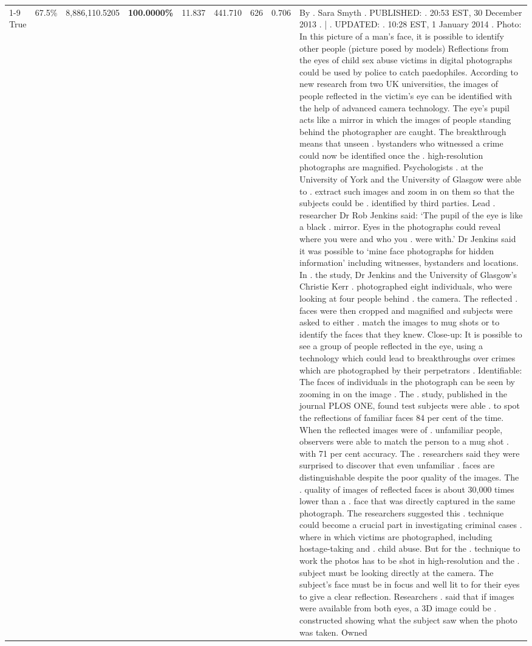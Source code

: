 \begin{table}[H]
\begin{tabular}{lllrlllll}
\cline{1-9}
True & 67.5\% & 8,886,110.5205 & \bfseries \color{red} 100.0000\% & 11.837 & 441.710 & 626 & 0.706 & By . Sara Smyth . PUBLISHED: . 20:53 EST, 30 December 2013 . | . UPDATED: . 10:28 EST, 1 January 2014 . Photo: In this picture of a man's face, it is possible to identify other people (picture posed by models) Reflections from the eyes of child sex abuse victims in digital photographs could be used by police to catch paedophiles. According to new research from two UK universities, the images of people reflected in the victim's eye can be identified with the help of advanced camera technology. The eye's pupil acts like a mirror in which the images of people standing behind the photographer are caught. The breakthrough means that unseen . bystanders who witnessed a crime could now be identified once the . high-resolution photographs are magnified. Psychologists . at the University of York and the University of Glasgow were able to . extract such images and zoom in on them so that the subjects could be . identified by third parties. Lead . researcher Dr Rob Jenkins said: ‘The pupil of the eye is like a black . mirror. Eyes in the photographs could reveal where you were and who you . were with.' Dr Jenkins said it was possible to ‘mine face photographs for hidden information' including witnesses, bystanders and locations. In . the study, Dr Jenkins and the University of Glasgow's Christie Kerr . photographed eight individuals, who were looking at four people behind . the camera. The reflected . faces were then cropped and magnified and subjects were asked to either . match the images to mug shots or to identify the faces that they knew. Close-up: It is possible to see a group of people reflected in the eye, using a technology which could lead to breakthroughs over crimes which are photographed by their perpetrators . Identifiable: The faces of individuals in the photograph can be seen by zooming in on the image . The . study, published in the journal PLOS ONE, found test subjects were able . to spot the reflections of familiar faces 84 per cent of the time. When the reflected images were of . unfamiliar people, observers were able to match the person to a mug shot . with 71 per cent accuracy. The . researchers said they were surprised to discover that even unfamiliar . faces are distinguishable despite the poor quality of the images. The . quality of images of reflected faces is about 30,000 times lower than a . face that was directly captured in the same photograph. The researchers suggested this . technique could become a crucial part in investigating criminal cases . where in which victims are photographed, including hostage-taking and . child abuse. But for the . technique to work the photos has to be shot in high-resolution and the . subject must be looking directly at the camera. The subject's face must be in focus and well lit to for their eyes to give a clear reflection. Researchers . said that if images were available from both eyes, a 3D image could be . constructed showing what the subject saw when the photo was taken. Owned \\

\end{tabular}
\end{table}
